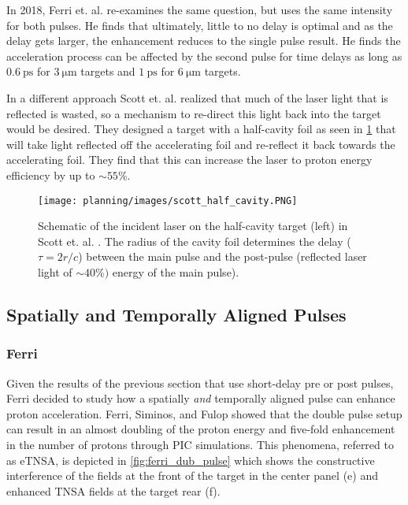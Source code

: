 In 2018, Ferri et. al. \cite{Ferri_2018_PoP} re-examines the same question, but uses the same intensity for both pulses. He finds that ultimately, little to no delay is optimal and as the delay gets larger, the enhancement reduces to the single pulse result. He finds the acceleration process can be affected by the second pulse for time delays as long as $\SI{0.6}{\pico \second}$ for $\SI{3}{\micro \meter}$ targets and $\SI{1}{\pico \second}$ for $\SI{6}{\micro \meter}$ targets. 

In a different approach Scott et. al. \cite{Scott_2012_APL} realized that much of the laser light that is reflected is wasted, so a mechanism to re-direct this light back into the target would be desired. They designed a target with a half-cavity foil as seen in \cref{fig:scott_half_cavity} that will take light reflected off the accelerating foil and re-reflect it back towards the accelerating foil. They find that this can increase the laser to proton energy efficiency by up to $\sim 55 \%$.

\begin{figure}
	\centering 
	\texttt{[image: planning/images/scott\_half\_cavity.PNG]}
	\caption{Schematic of the incident laser on the half-cavity target (left) in Scott et. al. \cite{Scott_2012_APL}. The radius of the cavity foil determines the delay ($\tau = 2 r/c$) between the main pulse and the post-pulse (reflected laser light of $\sim 40 \%)$ energy of the main pulse).}
	\label{fig:scott_half_cavity}
\end{figure}



\subsection{Spatially and Temporally Aligned Pulses}

\subsubsection{Ferri}
Given the results of the previous section \cite{Markey_2010_PRL,Scott_2012_APL,Ferri_2018_PoP} that use short-delay pre or post pulses, Ferri decided to study how a spatially \emph{and} temporally aligned pulse can enhance proton acceleration. Ferri, Siminos, and Fulop showed that the double pulse setup can result in an almost doubling of the proton energy and five-fold enhancement in the number of protons \cite{Ferri_2019_Nat_Comm} through \gls{PIC} simulations. This phenomena, referred to as \gls{eTNSA}, is depicted in \cref{fig:ferri_dub_pulse} which shows the constructive interference of the fields at the front of the target in the center panel (e) and enhanced \gls{TNSA} fields at the target rear (f).

